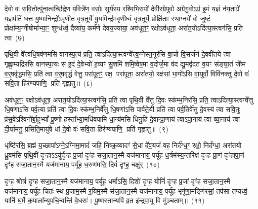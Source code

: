 {\anuvakamend[{मा त्वा॒ षट्च॑त्वारिꣳशच्च}]}

दे॒वो वः॑ सवि॒तोत्पु॑ना॒त्वच्छि॑द्रेण प॒वित्रे॑ण॒ वसोः॒ सूर्य॑स्य र॒श्मिभि॒रापो॑ देवीरग्रेपुवो अग्रेगु॒वो\-ऽग्र॑ इ॒मं य॒ज्ञं न॑य॒ताग्रे॑ य॒ज्ञप॑तिं धत्त यु॒ष्मानिन्द्रो॑\-ऽवृणीत वृत्र॒तूर्ये॑ यू॒यमिन्द्र॑मवृणीध्वं वृत्र॒तूर्ये॒ प्रोक्षि॑ताः स्था॒ग्नये॑ वो॒ जुष्टं॒ प्रोक्षा᳚म्य॒ग्नी\-षोमा᳚भ्या॒ꣳ॒ शुन्ध॑ध्वं॒ दैव्या॑य॒ कर्म॑णे देवय॒ज्याया॒ अव॑धूत॒ꣳ॒ रक्षो\-ऽव॑धूता॒ अरा॑त॒यो\-ऽदि॑त्या॒स्त्वग॑सि॒ प्रति॑ त्वा~(७)

पृथि॒वी वे᳚त्त्वधि॒षव॑णमसि वानस्प॒त्यं प्रति॒ त्वा\-ऽदि॑त्या॒स्त्वग्वे᳚त्त्व॒ग्नेस्त॒नूर॑सि वा॒चो वि॒सर्ज॑नं दे॒ववी॑तये त्वा गृह्णा॒म्यद्रि॑रसि वानस्प॒त्यः स इ॒दं दे॒वेभ्यो॑ ह॒व्यꣳ सु॒शमि॑ शमि॒ष्वेष॒मा व॒दोर्ज॒मा व॑द द्यु॒मद्व॑दत व॒यꣳ स॑ङ्घा॒तं जे᳚ष्म व॒र्॒षवृ॑द्धमसि॒ प्रति॑ त्वा व॒र्॒षवृ॑द्धं वेत्तु॒ परा॑पूत॒ꣳ॒ रक्ष॒ परा॑पूता॒ अरा॑तयो॒ रक्ष॑सां भा॒गो॑\-ऽसि वा॒युर्वो॒ विवि॑नक्तु दे॒वो वः॑ सवि॒ता हिर॑ण्यपाणि॒ प्रति॑ गृह्णातु॥~(८)

{\anuvakamend[{त्वा॒ भा॒ग एका॑\-दश च}]}

अव॑धूत॒ꣳ॒ रक्षो\-ऽव॑धूता॒ अरा॑त॒यो\-ऽदि॑त्या॒स्त्वग॑सि॒ प्रति॑ त्वा पृथि॒वी वे᳚त्तु दि॒वः स्क॑म्भ॒निर॑सि॒ प्रति॒ त्वा\-ऽदि॑त्या॒स्त्वग्वे᳚त्तु धि॒षणा॑\-ऽसि पर्व॒त्या प्रति॑ त्वा दि॒वः स्क॑म्भ॒निर्वे᳚त्तु धि॒षणा॑\-ऽसि पार्वते॒यी प्रति॑ त्वा पर्व॒तिर्वे᳚त्तु दे॒वस्य॑ त्वा सवि॒तुः प्र॑स॒वे᳚\-ऽश्विनो᳚र्बा॒हु\-भ्यां᳚ पू॒ष्णो हस्ता᳚भ्या॒मधि॑वपामि धा॒न्य॑मसि धिनु॒हि दे॒वान्प्रा॒णाय॑ त्वा\-ऽपा॒नाय॑ त्वा व्या॒नाय॑ त्वा दी॒र्घामनु॒ प्रसि॑ति॒मायु॑षे धां दे॒वो वः॑ सवि॒ता हिर॑ण्यपाणि॒ प्रति॑ गृह्णातु॥~(९)

{\anuvakamend[{प्रा॒णाय॑ त्वा॒ पञ्च॑दश च}]}

धृष्टि॑रसि॒ ब्रह्म॑ य॒च्छापा᳚\-ऽग्ने॒\-ऽग्निमा॒मादं॑ जहि॒ निष्क्र॒व्यादꣳ॑ से॒धा दे॑व॒यजं॑ वह॒ निर्द॑ग्ध॒ꣳ॒ रक्षो॒ निर्द॑ग्धा॒ अरा॑तयो ध्रु॒वम॑सि पृथि॒वीं दृ॒ꣳ॒हाऽऽयु॑र्दृꣳह प्र॒जां दृꣳ॑ह सजा॒तान॒स्मै यज॑मानाय॒ पर्यू॑ह ध॒र्त्रम॑स्य॒न्तरि॑क्षं दृꣳह प्रा॒णं दृꣳ॑हापा॒नं दृꣳ॑ह सजा॒ता\-न॒स्मै यज॑मानाय॒ पर्यू॑ह ध॒रुण॑मसि॒ दिवं॑ दृꣳह॒ चक्षु॑र्~(१०)

दृꣳह॒ श्रोत्रं॑ दृꣳह सजा॒तान॒स्मै यज॑मानाय॒ पर्यू॑ह॒ धर्मा॑\-ऽसि॒ दिशो॑ दृꣳह॒ योनिं॑ दृꣳह प्र॒जां दृꣳ॑ह सजा॒तान॒स्मै यज॑मानाय॒ पर्यू॑ह॒ चितः॑ स्थ प्र॒जाम॒स्मै र॒यिम॒स्मै स॑जा॒तान॒स्मै यज॑मानाय॒ पर्यू॑ह॒ भृगू॑णा॒मङ्गि॑रसां॒ तप॑सा तप्यध्वं॒ यानि॑ घ॒र्मे क॒पाला᳚न्युपचि॒न्वन्ति॑ वे॒धसः॑। पू॒ष्णस्तान्यपि॑ व्र॒त इ॑न्द्रवा॒यू वि मु॑ञ्चताम्॥~(११)

{\anuvakamend[{चक्षु॑र॒ष्टाच॑त्वारिꣳशच्च}]}

